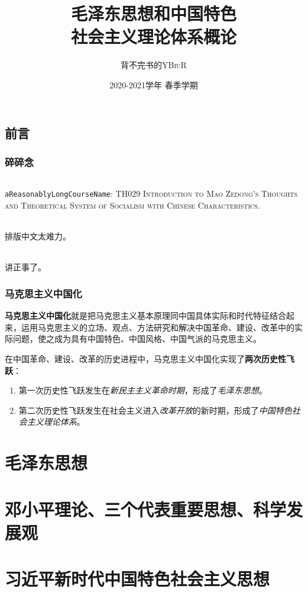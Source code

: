 \documentclass[oneside]{book}
\title{\Huge\textbf{毛泽东思想和中国特色\\社会主义理论体系概论}}
\author{背不完书的\textsc{YBiuR}}
\date{2020-2021学年{} 春季学期}
\begin{document}
\begin{spacing}{1.2}
\setlength{\parindent}{0em}
\setlength{\parskip}{1em}

\frontmatter
\maketitle
\chapter*{前言}
\section*{碎碎念}
\paragraph{}\verb|aReasonablyLongCourseName|: \textsc{TH029 Introduction to Mao Zedong's Thoughts and Theoretical System of Socialism with Chinese Characteristics}.
\paragraph{}排版中文太难力。
\paragraph{}讲正事了。


\section*{马克思主义中国化}
    \textbf{马克思主义中国化}就是把马克思主义基本原理同中国具体实际和时代特征结合起来，运用马克思主义的立场、观点、方法研究和解决中国革命、建设、改革中的实际问题，使之成为具有中国特色、中国风格、中国气派的马克思主义。

    在中国革命、建设、改革的历史进程中，马克思主义中国化实现了\textbf{两次历史性飞跃}：
    \begin{enumerate}
        \item 第一次历史性飞跃发生在\emph{新民主主义革命时期}，形成了\emph{毛泽东思想}。
        \item 第二次历史性飞跃发生在社会主义进入\emph{改革开放}的新时期，形成了\emph{中国特色社会主义理论体系}。
    \end{enumerate}


\tableofcontents

\mainmatter
\part{毛泽东思想}





\part{邓小平理论、三个代表重要思想、科学发展观}




\part{习近平新时代中国特色社会主义思想}



\end{spacing}
\end{document}
